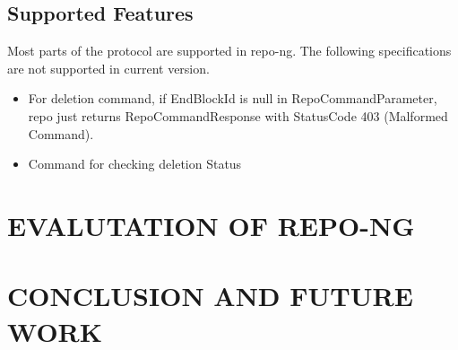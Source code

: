 \documentclass{acm_proc_article-sp}
\begin{document}
\subsection{Supported Features}
Most parts of the protocol are supported in repo-ng. The following specifications are not supported in current version.

\begin{itemize}

\item For deletion command, if EndBlockId is null in RepoCommandParameter, repo just returns RepoCommandResponse with StatusCode 403 (Malformed Command). 

\item Command for checking deletion Status

\end{itemize}

\section{EVALUTATION OF REPO-NG}

\section{CONCLUSION AND FUTURE WORK}



\end{document}
